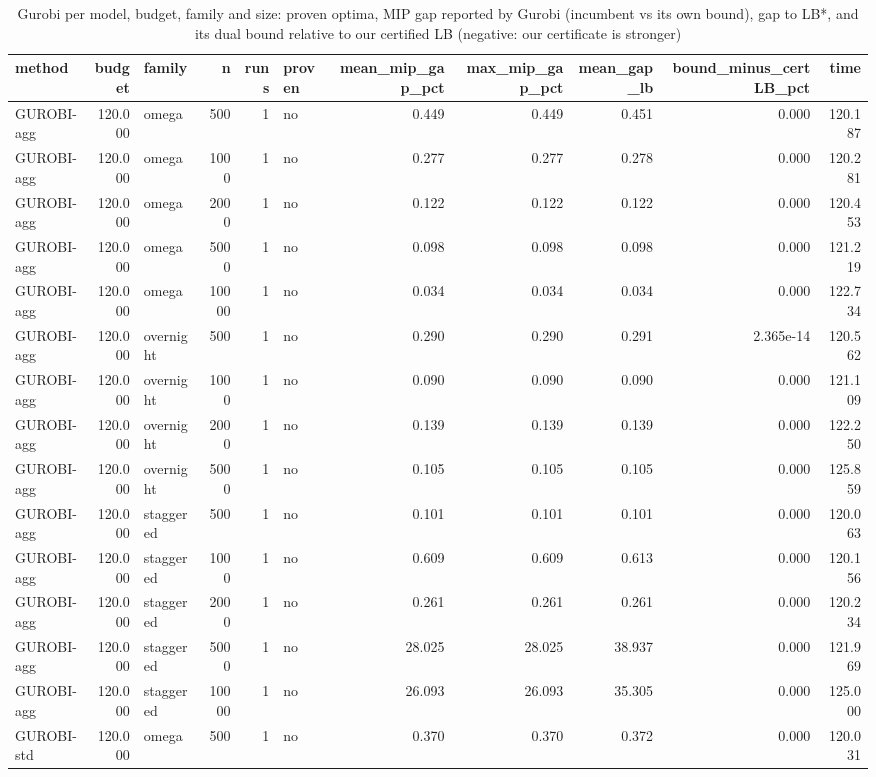 \begin{table}[htbp]
\centering
\small
\caption{Gurobi per model, budget, family and size: proven optima, MIP gap reported by Gurobi (incumbent vs its own bound), gap to LB*, and its dual bound relative to our certified LB (negative: our certificate is stronger)}
\label{tab:E6_scalability_gurobi}
\begin{tabular}{lrlrrlrrrrr}
\toprule
method & budget & family & n & runs & proven & mean\_mip\_gap\_pct & max\_mip\_gap\_pct & mean\_gap\_lb & bound\_minus\_certLB\_pct & time \\
\midrule
GUROBI-agg & 120.000 & omega & 500 & 1 & no & 0.449 & 0.449 & 0.451 & 0.000 & 120.187 \\
GUROBI-agg & 120.000 & omega & 1000 & 1 & no & 0.277 & 0.277 & 0.278 & 0.000 & 120.281 \\
GUROBI-agg & 120.000 & omega & 2000 & 1 & no & 0.122 & 0.122 & 0.122 & 0.000 & 120.453 \\
GUROBI-agg & 120.000 & omega & 5000 & 1 & no & 0.098 & 0.098 & 0.098 & 0.000 & 121.219 \\
GUROBI-agg & 120.000 & omega & 10000 & 1 & no & 0.034 & 0.034 & 0.034 & 0.000 & 122.734 \\
GUROBI-agg & 120.000 & overnight & 500 & 1 & no & 0.290 & 0.290 & 0.291 & 2.365e-14 & 120.562 \\
GUROBI-agg & 120.000 & overnight & 1000 & 1 & no & 0.090 & 0.090 & 0.090 & 0.000 & 121.109 \\
GUROBI-agg & 120.000 & overnight & 2000 & 1 & no & 0.139 & 0.139 & 0.139 & 0.000 & 122.250 \\
GUROBI-agg & 120.000 & overnight & 5000 & 1 & no & 0.105 & 0.105 & 0.105 & 0.000 & 125.859 \\
GUROBI-agg & 120.000 & staggered & 500 & 1 & no & 0.101 & 0.101 & 0.101 & 0.000 & 120.063 \\
GUROBI-agg & 120.000 & staggered & 1000 & 1 & no & 0.609 & 0.609 & 0.613 & 0.000 & 120.156 \\
GUROBI-agg & 120.000 & staggered & 2000 & 1 & no & 0.261 & 0.261 & 0.261 & 0.000 & 120.234 \\
GUROBI-agg & 120.000 & staggered & 5000 & 1 & no & 28.025 & 28.025 & 38.937 & 0.000 & 121.969 \\
GUROBI-agg & 120.000 & staggered & 10000 & 1 & no & 26.093 & 26.093 & 35.305 & 0.000 & 125.000 \\
GUROBI-std & 120.000 & omega & 500 & 1 & no & 0.370 & 0.370 & 0.372 & 0.000 & 120.031 \\

\end{tabular}
\end{table}
